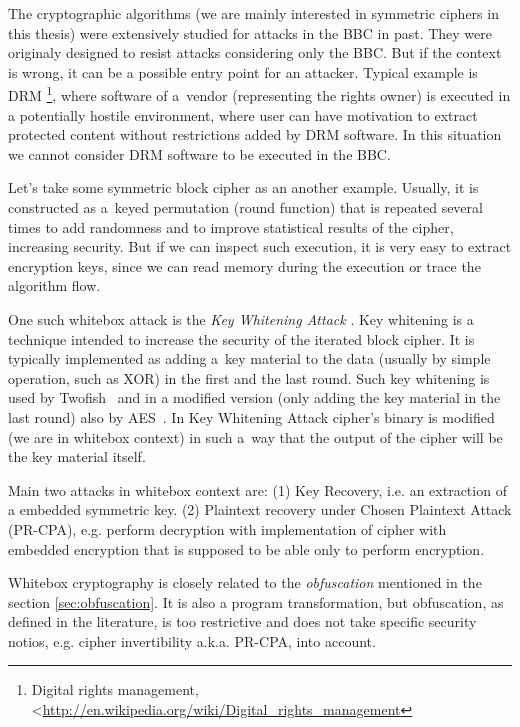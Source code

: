 \documentclass[11pt,oneside,final]{fithesis2}
\begin{document}
    The cryptographic algorithms (we are mainly interested in symmetric ciphers in this thesis) were extensively studied for attacks in the BBC in past.
    They were originaly designed to resist attacks considering only the BBC. But if the context is wrong, it can be a possible entry point for an attacker.
    Typical example is DRM \footnote{Digital rights management, \textless\url{http://en.wikipedia.org/wiki/Digital_rights_management}}, where software of a~vendor
    (representing the rights owner) is executed in a potentially hostile environment, where user can have motivation to extract protected content without
    restrictions added by DRM software. In this situation we cannot consider DRM software to be executed in the BBC.
    
    Let's take some symmetric block cipher as an another example. Usually, it is constructed as a~keyed permutation (round function) that is repeated 
    several times to add randomness and to improve statistical results of the cipher, increasing security. But if we can inspect such execution, it is 
    very easy to extract encryption keys, since we can read memory during the execution or trace the algorithm flow.
    
    One such whitebox attack is the \emph{Key Whitening Attack} \cite{Kerins06acautionary}. Key whitening is a technique intended to increase the security of the iterated block cipher.
    It is typically implemented as adding a~key material to the data (usually by simple operation, such as XOR) in the first and the last round. Such key whitening 
    is used by Twofish~\citep{Schneier98twofish:a} and in a modified version (only adding the key material in the last round) also by AES~\citep{2002-daemen}. In Key Whitening Attack
    cipher's binary is modified (we are in whitebox context) in such a~way that the output of the cipher will be the key material itself. 
    
     Main two attacks in whitebox context are: (1) Key Recovery, i.e. an extraction of a embedded symmetric key. (2) Plaintext recovery under Chosen Plaintext Attack (PR-CPA), e.g. perform decryption with 
 	implementation of cipher with embedded encryption that is supposed to be able only to perform encryption.


    Whitebox cryptography is closely related to the \emph{obfuscation} mentioned in the section \ref{sec:obfuscation}. It is also a program transformation,
    but obfuscation, as defined in the literature, is too restrictive and does not take specific security notios, e.g. cipher invertibility
    a.k.a. PR-CPA, into account. 
    
\end{document}
